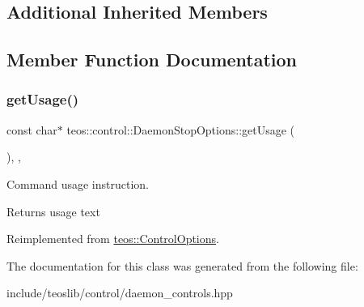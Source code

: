 \subsection*{Additional Inherited Members}


\subsection{Member Function Documentation}
\mbox{\label{classteos_1_1control_1_1_daemon_stop_options_a99e7d5a47cd20e4ad437049263cd367a}} 
\subsubsection{\texorpdfstring{get\+Usage()}{getUsage()}}
{\footnotesize\ttfamily const char$\ast$ teos\+::control\+::\+Daemon\+Stop\+Options\+::get\+Usage (\begin{DoxyParamCaption}{ }\end{DoxyParamCaption})\hspace{0.3cm}{\ttfamily [inline]}, {\ttfamily [protected]}, {\ttfamily [virtual]}}



Command \textquotesingle{}usage\textquotesingle{} instruction. 

\begin{DoxyReturn}{Returns}
usage text 
\end{DoxyReturn}


Reimplemented from \mbox{\hyperlink{classteos_1_1_control_options_a0aa5671f9bc750ed5280c26c543874f3}{teos\+::\+Control\+Options}}.



The documentation for this class was generated from the following file\+:\begin{DoxyCompactItemize}
\item 
include/teoslib/control/daemon\+\_\+controls.\+hpp\end{DoxyCompactItemize}
